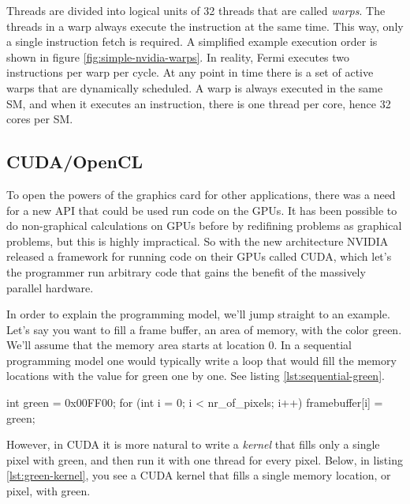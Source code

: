 \documentclass[../main/report.tex]{subfiles}
\begin{document}
Threads are divided into logical units of 32 threads that are called \emph{warps}. 
The threads in a warp always execute the instruction at the same time.
This way, only a single instruction fetch is required.
A simplified example execution order is shown in figure \ref{fig:simple-nvidia-warps}.
In reality, Fermi executes two instructions per warp per cycle. 
At any point in time there is a set of active warps that are dynamically scheduled. 
A warp is always executed in the same SM, and when it executes an instruction, there is one thread per core, hence 32 cores per SM.




\subsection{CUDA/OpenCL}

To open the powers of the graphics card for other applications, there was a need for a new API that could be
used run code on the GPUs. It has been possible to do non-graphical calculations on GPUs before by 
redifining problems as graphical problems, but this is highly impractical. 
So with the new architecture NVIDIA released a framework for running code on their GPUs called CUDA, 
which let's the programmer run arbitrary code that gains the benefit of the massively parallel hardware.

In order to explain the programming model, we'll jump straight to an example.
Let's say you want to fill a frame buffer, an area of memory, with the color green.
We'll assume that the memory area starts at location 0.
In a sequential programming model one would typically write a loop that would fill
the memory locations with the value for green one by one.
See listing \ref{lst:sequential-green}.

\begin{c-code}[caption=A sequential program filling the screen with green, label=lst:sequential-green]
int green = 0x00FF00;
for (int i = 0; i < nr_of_pixels; i++){
	framebuffer[i] = green;
}
\end{c-code}

However, in CUDA it is more natural to write a \emph{kernel} that fills only a single pixel with green, 
and then run it with one thread for every pixel.
Below, in listing \ref{lst:green-kernel},
you see a CUDA kernel that fills a single memory location, or pixel, with green.
\end{document}

